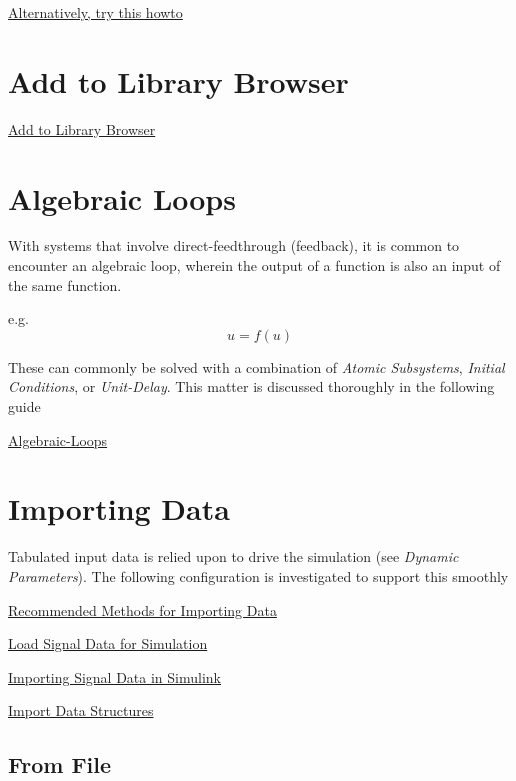 \documentclass[]{book}
\begin{document}
\href{http://www3.nd.edu/~nancy/Math20550/Homework/matlabpath.pdf}{Alternatively,
try this howto}

\section{Add to Library Browser}\label{add-to-library-browser}

\href{http://www.mathworks.com/help/simulink/ug/adding-libraries-to-the-library-browser.html}{Add
to Library Browser}

\section{Algebraic Loops}\label{algebraic-loops}

With systems that involve direct-feedthrough (feedback), it is common to
encounter an algebraic loop, wherein the output of a function is also an
input of the same function.

e.g. \[ u = f(u) \]

These can commonly be solved with a combination of \emph{Atomic
Subsystems}, \emph{Initial Conditions}, or \emph{Unit-Delay}. This
matter is discussed thoroughly in the following guide

\href{http://www.mathworks.com/help/simulink/ug/algebraic-loops.html}{Algebraic-Loops}

\section{Importing Data}\label{importing-data}

Tabulated input data is relied upon to drive the simulation (see
\emph{Dynamic Parameters}). The following configuration is investigated
to support this smoothly

\href{http://www.mathworks.com/help/matlab/import_export/recommended-methods-for-importing-data.html}{Recommended
Methods for Importing Data}

\href{http://www.mathworks.com/help/simulink/import-data.html}{Load
Signal Data for Simulation}

\href{http://www.mathworks.com/help/simulink/ug/importing-signal-data-in-simulink.html}{Importing
Signal Data in Simulink}

\href{http://www.mathworks.com/help/simulink/ug/importing-data-structures-to-a-root-level-input-port.html}{Import
Data Structures}

\subsection{From File}\label{from-file}
\end{document}
